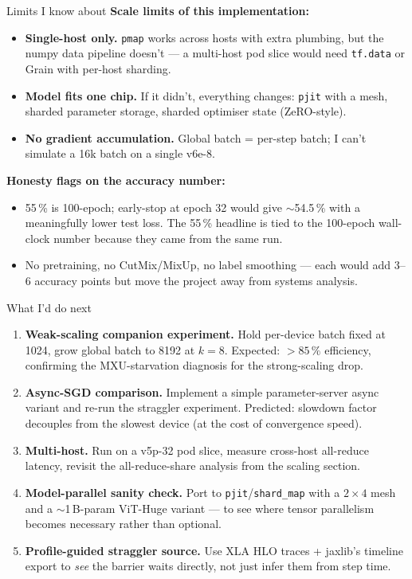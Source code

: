 \documentclass[aspectratio=169,10pt]{beamer}
\begin{document}
\begin{frame}{Limits I know about}
  \textbf{Scale limits of this implementation:}
  \begin{itemize}
    \item \textbf{Single-host only.} \texttt{pmap} works across hosts with extra plumbing,
          but the numpy data pipeline doesn't — a multi-host pod slice would need
          \texttt{tf.data} or Grain with per-host sharding.
    \item \textbf{Model fits one chip.} If it didn't, everything changes: \texttt{pjit}
          with a mesh, sharded parameter storage, sharded optimiser state (ZeRO-style).
    \item \textbf{No gradient accumulation.} Global batch = per-step batch; I can't
          simulate a 16k batch on a single v6e-8.
  \end{itemize}

  \vspace{0.3em}
  \textbf{Honesty flags on the accuracy number:}
  \begin{itemize}
    \item 55\,\% is 100-epoch; early-stop at epoch 32 would give $\sim$54.5\,\% with a
          meaningfully lower test loss. The 55\,\% headline is tied to the 100-epoch
          wall-clock number because they came from the same run.
    \item No pretraining, no CutMix/MixUp, no label smoothing — each would add 3--6
          accuracy points but move the project away from systems analysis.
  \end{itemize}
\end{frame}

\begin{frame}{What I'd do next}
  \begin{enumerate}
    \item \textbf{Weak-scaling companion experiment.} Hold per-device batch fixed at 1024,
          grow global batch to 8192 at $k=8$. Expected: $>85\,\%$ efficiency, confirming
          the MXU-starvation diagnosis for the strong-scaling drop.
    \item \textbf{Async-SGD comparison.} Implement a simple parameter-server async variant
          and re-run the straggler experiment. Predicted: slowdown factor decouples from
          the slowest device (at the cost of convergence speed).
    \item \textbf{Multi-host.} Run on a v5p-32 pod slice, measure cross-host all-reduce
          latency, revisit the all-reduce-share analysis from the scaling section.
    \item \textbf{Model-parallel sanity check.} Port to \texttt{pjit}/\texttt{shard\_map}
          with a $2\times 4$ mesh and a $\sim$1\,B-param ViT-Huge variant — to see where
          tensor parallelism becomes necessary rather than optional.
    \item \textbf{Profile-guided straggler source.} Use XLA HLO traces + jaxlib's timeline
          export to \emph{see} the barrier waits directly, not just infer them from step
          time.
  \end{enumerate}
\end{frame}
\end{document}
